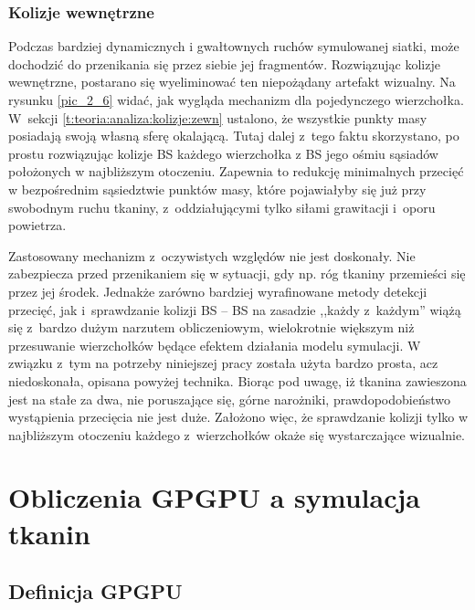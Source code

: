 			\subsubsection{Kolizje wewnętrzne}
			\label{t:teoria:analiza:kolizje:wewn}
			
				
				Podczas bardziej dynamicznych i gwałtownych ruchów symulowanej siatki, może dochodzić do przenikania się przez siebie jej fragmentów. Rozwiązując kolizje wewnętrzne, postarano się wyeliminować ten niepożądany artefakt wizualny. Na rysunku \ref{pic_2_6} widać, jak wygląda mechanizm dla pojedynczego wierzchołka. W~sekcji \ref{t:teoria:analiza:kolizje:zewn} ustalono, że wszystkie punkty masy posiadają swoją własną sferę okalającą. Tutaj dalej z~tego faktu skorzystano, po prostu rozwiązując kolizje BS każdego wierzchołka z BS jego ośmiu sąsiadów położonych w najbliższym otoczeniu. Zapewnia to redukcję minimalnych przecięć w bezpośrednim sąsiedztwie punktów masy, które pojawiałyby się już przy swobodnym ruchu tkaniny, z~oddziałującymi tylko siłami grawitacji i~oporu powietrza.
				
				Zastosowany mechanizm z~oczywistych względów nie jest doskonały. Nie zabezpiecza przed przenikaniem się w sytuacji, gdy np. róg tkaniny przemieści się przez jej środek. Jednakże zarówno bardziej wyrafinowane metody detekcji przecięć, jak i~sprawdzanie kolizji BS -- BS na zasadzie ,,każdy z~każdym'' wiążą się z~bardzo dużym narzutem obliczeniowym, wielokrotnie większym niż przesuwanie wierzchołków będące efektem działania modelu symulacji. W związku z~tym na potrzeby niniejszej pracy została użyta bardzo prosta, acz niedoskonała, opisana powyżej technika. Biorąc pod uwagę, iż tkanina zawieszona jest na stałe za dwa, nie poruszające się, górne narożniki, prawdopodobieństwo wystąpienia przecięcia nie jest duże. Założono więc, że sprawdzanie kolizji tylko w najbliższym otoczeniu każdego z~wierzchołków okaże się wystarczające wizualnie.
			
	\section{Obliczenia GPGPU a symulacja tkanin}
	\label{t:teoria:gpu}
	
		\subsection{Definicja GPGPU}
		\label{t:teoria:gpu:gpgpu}
		
